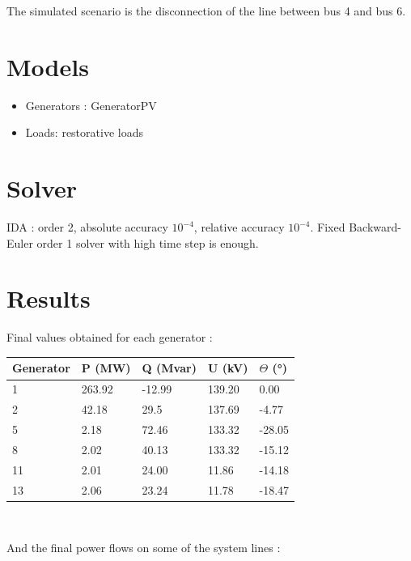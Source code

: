 \documentclass[a4paper, 12pt]{report}
\begin{document}
The simulated scenario is the disconnection of the line between bus 4 and bus 6.

\section{Models}

\begin{itemize}
  \item Generators : GeneratorPV
  \item Loads: restorative loads
\end{itemize}

\section{Solver}

IDA : order 2, absolute accuracy $10^{-4}$, relative accuracy $10^{-4}$. Fixed Backward-Euler order 1 solver with high time step is enough.

\section{Results}

Final values obtained for each generator : \\

\begin{tabular}{ | m{2cm} | m{2cm}| m{2cm} | m{2cm} | m{2cm} | }
  \hline
  \textbf{Generator} & \textbf{P (MW)} & \textbf{Q (Mvar)} & \textbf{U (kV)} & \textbf{$\Theta$ (°)} \\
  \hline
  1 & 263.92 & -12.99 & 139.20 & 0.00 \\
  \hline
  2 & 42.18 & 29.5 & 137.69 & -4.77 \\
  \hline
  5 & 2.18 & 72.46 & 133.32 & -28.05 \\
  \hline
  8 & 2.02 & 40.13 & 133.32 & -15.12 \\
  \hline
  11 & 2.01 & 24.00 & 11.86 & -14.18 \\
  \hline
  13 & 2.06 & 23.24 & 11.78 & -18.47 \\
  \hline
\end{tabular} \\

\pagebreak

And the final power flows on some of the system lines : \\
\end{document}
